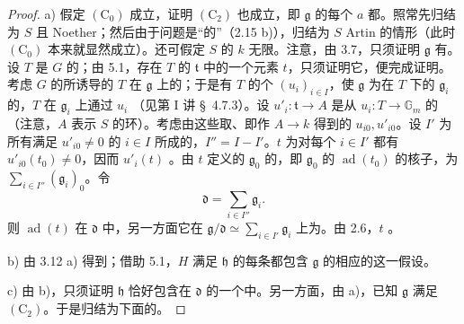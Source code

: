 \begin{proof}
a) 假定 $(\mathrm C_0)$ 成立，证明 $(\mathrm C_2)$ 也成立，即 $\mathfrak g$ 的每个 $a$ 都。照常先归结为 $S$ 且 Noether；然后由于问题是“的”（2.15 b)），归结为 $S$ Artin 的情形（此时 $(\mathrm C_0)$ 本来就显然成立）。还可假定 $S$ 的 $k$ 无限。注意，由 3.7，只须证明 $\mathfrak g$ 有。设 $T$ 是 $G$ 的；由 5.1，存在 $T$ 的 $\mathfrak t$ 中的一个元素 $t$，只须证明它，便完成证明。考虑 $G$ 的所诱导的 $T$ 在 $\mathfrak g$ 上的；于是有 $T$ 的个 $(u_i)_{i\in I}$，使 $\mathfrak g$ 为在 $T$ 下的 $\mathfrak g_i$ 的，$T$ 在 $\mathfrak g_i$ 上通过 $u_i$ （见第 I 讲 \S~4.7.3）。设 $u'_i:\mathfrak t\to A$ 是从 $u_i:T\to\mathbb G_m$ 的（注意，$A$ 表示 $S$ 的环）。考虑由这些取、即作 $A\to k$ 得到的 $u_{i0},u'_{i0}$。设 $I'$ 为所有满足 $u'_{i0}\ne0$ 的 $i\in I$ 所成的，$I''=I-I'$。$t$ 为对每个 $i\in I'$ 都有 $u'_{i0}(t_0)\ne0$，因而 $u'_i(t)$ 。由 $t$ 定义的 $\mathfrak g_0$ 的，即 $\mathfrak g_0$ 的 $\operatorname{ad}(t_0)$ 的核子，为 $\sum_{i\in I''}(\mathfrak g_i)_0$。令
\[\mathfrak d=\sum_{i\in I''}\mathfrak g_i.\]
则 $\operatorname{ad}(t)$ 在 $\mathfrak d$ 中，另一方面它在 $\mathfrak g/\mathfrak d\simeq\sum_{i\in I'}\mathfrak g_i$ 上为。由 2.6，$t$ 。

b) 由 3.12 a) 得到；借助 5.1，$H$ 满足 $\mathfrak h$ 的每条都包含 $\mathfrak g$ 的相应的这一假设。

c) 由 b)，只须证明 $\mathfrak h$ 恰好包含在 $\mathfrak d$ 的一个中。另一方面，由 a)，已知 $\mathfrak g$ 满足 $(\mathrm C_2)$。于是归结为下面的。
\end{proof}
